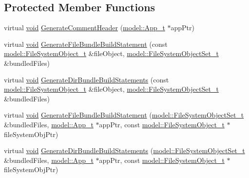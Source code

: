 \subsection*{Protected Member Functions}
\begin{DoxyCompactItemize}
\item 
virtual \hyperlink{_t_e_m_p_l_a_t_e__cdef_8h_ac9c84fa68bbad002983e35ce3663c686}{void} \hyperlink{classninja_1_1_app_build_script_generator__t_acdffc20dae7711b464e8e18f74da3c94}{Generate\+Comment\+Header} (\hyperlink{structmodel_1_1_app__t}{model\+::\+App\+\_\+t} $\ast$app\+Ptr)
\item 
virtual \hyperlink{_t_e_m_p_l_a_t_e__cdef_8h_ac9c84fa68bbad002983e35ce3663c686}{void} \hyperlink{classninja_1_1_app_build_script_generator__t_a21e043eb891c27229f4b626d0aa05130}{Generate\+File\+Bundle\+Build\+Statement} (const \hyperlink{structmodel_1_1_file_system_object__t}{model\+::\+File\+System\+Object\+\_\+t} \&file\+Object, \hyperlink{namespacemodel_aeb77dad74c69ec8bfc42dc205bac3f4b}{model\+::\+File\+System\+Object\+Set\+\_\+t} \&bundled\+Files)
\item 
virtual \hyperlink{_t_e_m_p_l_a_t_e__cdef_8h_ac9c84fa68bbad002983e35ce3663c686}{void} \hyperlink{classninja_1_1_app_build_script_generator__t_aacf993a44a97cf5c285973359a8dce0a}{Generate\+Dir\+Bundle\+Build\+Statements} (const \hyperlink{structmodel_1_1_file_system_object__t}{model\+::\+File\+System\+Object\+\_\+t} \&file\+Object, \hyperlink{namespacemodel_aeb77dad74c69ec8bfc42dc205bac3f4b}{model\+::\+File\+System\+Object\+Set\+\_\+t} \&bundled\+Files)
\item 
virtual \hyperlink{_t_e_m_p_l_a_t_e__cdef_8h_ac9c84fa68bbad002983e35ce3663c686}{void} \hyperlink{classninja_1_1_app_build_script_generator__t_aaa5b3eafa4819c7e3cebdce8341d7b0d}{Generate\+File\+Bundle\+Build\+Statement} (\hyperlink{namespacemodel_aeb77dad74c69ec8bfc42dc205bac3f4b}{model\+::\+File\+System\+Object\+Set\+\_\+t} \&bundled\+Files, \hyperlink{structmodel_1_1_app__t}{model\+::\+App\+\_\+t} $\ast$app\+Ptr, const \hyperlink{structmodel_1_1_file_system_object__t}{model\+::\+File\+System\+Object\+\_\+t} $\ast$file\+System\+Obj\+Ptr)
\item 
virtual \hyperlink{_t_e_m_p_l_a_t_e__cdef_8h_ac9c84fa68bbad002983e35ce3663c686}{void} \hyperlink{classninja_1_1_app_build_script_generator__t_a6c7c0c34a38bd0b41e477448bf83710d}{Generate\+Dir\+Bundle\+Build\+Statements} (\hyperlink{namespacemodel_aeb77dad74c69ec8bfc42dc205bac3f4b}{model\+::\+File\+System\+Object\+Set\+\_\+t} \&bundled\+Files, \hyperlink{structmodel_1_1_app__t}{model\+::\+App\+\_\+t} $\ast$app\+Ptr, const \hyperlink{structmodel_1_1_file_system_object__t}{model\+::\+File\+System\+Object\+\_\+t} $\ast$file\+System\+Obj\+Ptr)

\end{DoxyCompactItemize}
